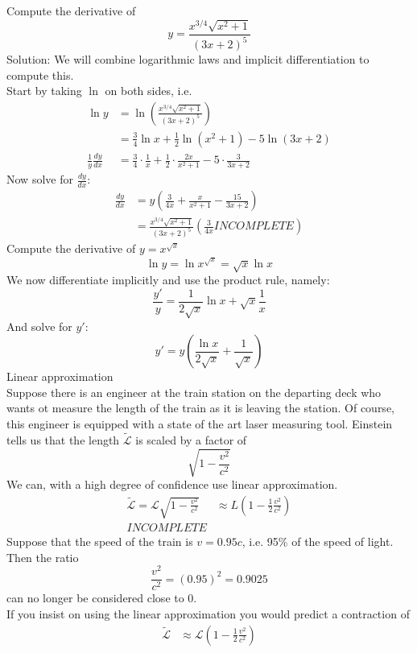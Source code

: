 \documentclass[]{article}
\begin{document}
	\normalsize
	Compute the derivative of 
	$$
		y=\frac{x^{3/4}\sqrt{x^2+1}}{(3x+2)^5}
	$$
	Solution: We will combine logarithmic laws and implicit differentiation to compute this.\\
	Start by taking $\ln$ on both sides, i.e.
	\begin{align*}
		\ln y&=\ln\left(\frac{x^{3/4}\sqrt{x^2+1}}{(3x+2)^5}\right)\\
		&=\frac{3}{4}\ln x+\frac{1}{2}\ln(x^2+1)-5\ln(3x+2)\\
		\frac{1}{y}\frac{dy}{dx}&=\frac{3}{4}\cdot\frac{1}{x}+\frac{1}{2}\cdot\frac{2x}{x^2+1}-5\cdot\frac{3}{3x+2}
	\end{align*}
	Now solve for $\frac{dy}{dx}$:
	\begin{align*}
		\frac{dy}{dx}&=y\left(\frac{3}{4x}+\frac{x}{x^2+1}-\frac{15}{3x+2}\right)\\
		&=\frac{x^{3/4}\sqrt{x^2+1}}{(3x+2)^5}\left(\frac{3}{4x} INCOMPLETE \right)
	\end{align*}
	Compute the derivative of $y=x^{\sqrt{x}}$\\
	$$
		\ln y=\ln x^{\sqrt{x}}=\sqrt{x}\ln x
	$$
	We now differentiate implicitly and use the product rule, namely:
	$$
		\frac{y'}{y}=\frac{1}{2\sqrt{x}}\ln x+\sqrt{x}\frac{1}{x}
	$$
	And solve for $y'$:
	$$
		y'=y\left(\frac{\ln x}{2\sqrt{x}}+\frac{1}{\sqrt{x}}\right)
	$$
	\large{Linear approximation}\\
	Suppose there is an engineer at the train station on the departing deck who wants ot measure the length of the train as it is leaving the station. Of course, this engineer is equipped with a state of the art laser measuring tool. Einstein tells us that the length $\tilde{\mathcal{L}}$ is scaled by a factor of
	$$
		\sqrt{1-\frac{v^2}{c^2}}
	$$
	We can, with a high degree of confidence use linear approximation.
	\begin{align*}
		\tilde{\mathcal{L}}=\mathcal{L}\sqrt{1-\frac{v^2}{c^2}}&\approx L\left(1-\frac{1}{2}\frac{v^2}{c^2}\right)\\
		INCOMPLETE
	\end{align*}
	Suppose that the speed of the train is $v=0.95c$, i.e. 95\% of the speed of light. Then the ratio
	$$
		\frac{v^2}{c^2}=(0.95)^2=0.9025
	$$
	can no longer be considered close to 0.\\
	If you insist on using the linear approximation you would predict a contraction of
	\begin{align*}
		\tilde{\mathcal{L}}&\approx \mathcal{L}\left(1-\frac{1}2\frac{v^2}{c^2}\right)
	\end{align*}
\end{document}
